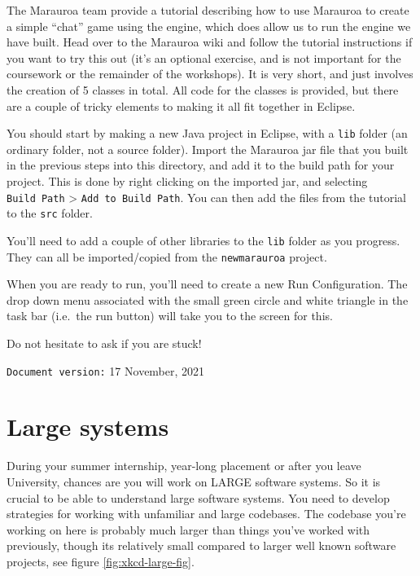 \documentclass[
]{book}
\begin{document}
The Marauroa team provide a tutorial describing how to use Marauroa to create a simple ``chat'' game using the engine, which does allow us to run the engine we have built. Head over to the Marauroa wiki and follow the tutorial instructions if you want to try this out (it's an optional exercise, and is not important for the coursework or the remainder of the workshops). It is very short, and just involves the creation of 5 classes in total. All code for the classes is provided, but there are a couple of tricky elements to making it all fit together in Eclipse.

You should start by making a new Java project in Eclipse, with a \texttt{lib} folder (an ordinary folder, not a source folder). Import the Marauroa jar file that you built in the previous steps into this directory, and add it to the build path for your project. This is done by right clicking on the imported jar, and selecting \texttt{Build\ Path} \textgreater{} \texttt{Add\ to\ Build\ Path}. You can then add the files from the tutorial to the \texttt{src} folder.

You'll need to add a couple of other libraries to the \texttt{lib} folder as you progress. They can all be imported/copied from the \texttt{newmarauroa} project.

When you are ready to run, you'll need to create a new Run Configuration. The drop down menu associated with the small green circle and white triangle in the task bar (i.e.~the run button) will take you to the screen for this.

Do not hesitate to ask if you are stuck!

\texttt{Document\ version:} 17 November, 2021

\hypertarget{understanding}{%
\chapter{Large systems}\label{understanding}}

During your summer internship, year-long placement or after you leave University, chances are you will work on LARGE software systems. So it is crucial to be able to understand large software systems. You need to develop strategies for working with unfamiliar and large codebases. The codebase you're working on here is probably much larger than things you've worked with previously, though its relatively small compared to larger well known software projects, see figure \ref{fig:xkcd-large-fig}.
\end{document}
